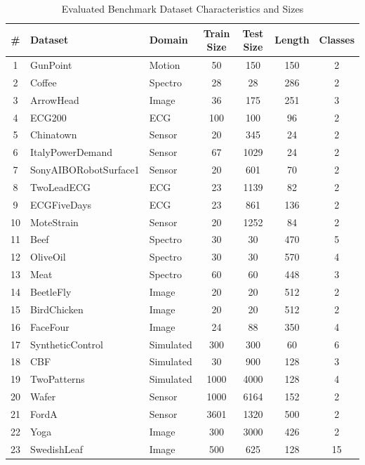 \documentclass[conference]{IEEEtran}
\begin{document}
\begin{table}[htbp]
\caption{Evaluated Benchmark Dataset Characteristics and Sizes}
\label{tab:dataset_sizes}
\centering
\begin{tabular}{|c|l|l|c|c|c|c|}
\hline
\# & Dataset & Domain & Train Size & Test Size & Length & Classes \\ \hline
1 & GunPoint & Motion & 50 & 150 & 150 & 2 \\
2 & Coffee & Spectro & 28 & 28 & 286 & 2 \\
3 & ArrowHead & Image & 36 & 175 & 251 & 3 \\
4 & ECG200 & ECG & 100 & 100 & 96 & 2 \\
5 & Chinatown & Sensor & 20 & 345 & 24 & 2 \\
6 & ItalyPowerDemand & Sensor & 67 & 1029 & 24 & 2 \\
7 & SonyAIBORobotSurface1 & Sensor & 20 & 601 & 70 & 2 \\
8 & TwoLeadECG & ECG & 23 & 1139 & 82 & 2 \\
9 & ECGFiveDays & ECG & 23 & 861 & 136 & 2 \\
10 & MoteStrain & Sensor & 20 & 1252 & 84 & 2 \\
11 & Beef & Spectro & 30 & 30 & 470 & 5 \\
12 & OliveOil & Spectro & 30 & 30 & 570 & 4 \\
13 & Meat & Spectro & 60 & 60 & 448 & 3 \\
14 & BeetleFly & Image & 20 & 20 & 512 & 2 \\
15 & BirdChicken & Image & 20 & 20 & 512 & 2 \\
16 & FaceFour & Image & 24 & 88 & 350 & 4 \\
17 & SyntheticControl & Simulated & 300 & 300 & 60 & 6 \\
18 & CBF & Simulated & 30 & 900 & 128 & 3 \\
19 & TwoPatterns & Simulated & 1000 & 4000 & 128 & 4 \\
20 & Wafer & Sensor & 1000 & 6164 & 152 & 2 \\
21 & FordA & Sensor & 3601 & 1320 & 500 & 2 \\
22 & Yoga & Image & 300 & 3000 & 426 & 2 \\
23 & SwedishLeaf & Image & 500 & 625 & 128 & 15 \\ \hline
\end{tabular}
\end{table}
\end{document}
